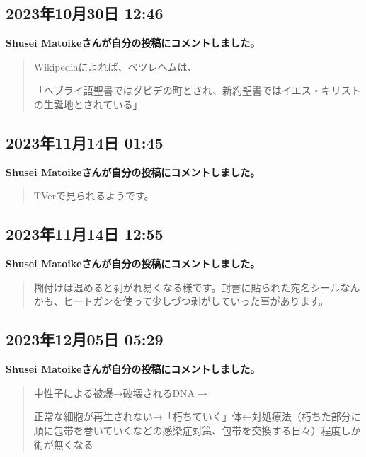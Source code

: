 \subsection*{2023年10月30日 12:46}

\textbf{Shusei Matoikeさんが自分の投稿にコメントしました。}

\begin{quote}
Wikipediaによれば、ベツレヘムは、

「ヘブライ語聖書ではダビデの町とされ、新約聖書ではイエス・キリストの生誕地とされている」
\end{quote}

\subsection*{2023年11月14日 01:45}

\textbf{Shusei Matoikeさんが自分の投稿にコメントしました。}

\begin{quote}
TVerで見られるようです。
\end{quote}

\subsection*{2023年11月14日 12:55}

\textbf{Shusei Matoikeさんが自分の投稿にコメントしました。}

\begin{quote}
糊付けは温めると剥がれ易くなる様です。封書に貼られた宛名シールなんかも、ヒートガンを使って少しづつ剥がしていった事があります。
\end{quote}

\subsection*{2023年12月05日 05:29}

\textbf{Shusei Matoikeさんが自分の投稿にコメントしました。}

\begin{quote}
中性子による被爆→破壊されるDNA🧬→

正常な細胞が再生されない→「朽ちていく」体←対処療法（朽ちた部分に順に包帯を巻いていくなどの感染症対策、包帯を交換する日々）程度しか術が無くなる
\end{quote}

